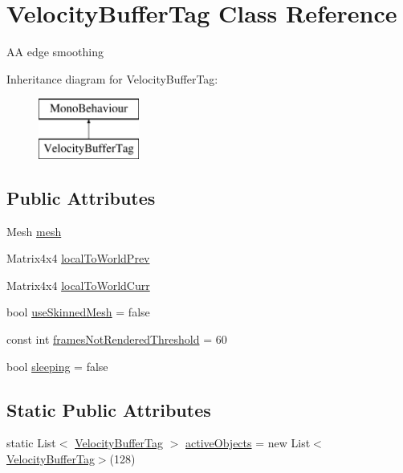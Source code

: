 \hypertarget{class_velocity_buffer_tag}{}\section{Velocity\+Buffer\+Tag Class Reference}
\label{class_velocity_buffer_tag}


AA edge smoothing  


Inheritance diagram for Velocity\+Buffer\+Tag\+:\begin{figure}[H]
\begin{center}
\leavevmode
\includegraphics[height=2.000000cm]{class_velocity_buffer_tag}
\end{center}
\end{figure}
\subsection*{Public Attributes}
\begin{DoxyCompactItemize}
\item 
Mesh \mbox{\hyperlink{class_velocity_buffer_tag_a163f9e15132764a035a268802494a86d}{mesh}}
\item 
Matrix4x4 \mbox{\hyperlink{class_velocity_buffer_tag_a0833e64a1ec98596b324b8f8c72f1ad0}{local\+To\+World\+Prev}}
\item 
Matrix4x4 \mbox{\hyperlink{class_velocity_buffer_tag_a7df321716493a4f323186e062e407435}{local\+To\+World\+Curr}}
\item 
bool \mbox{\hyperlink{class_velocity_buffer_tag_a2242c0bf56dce5a4e6c907d4e51df258}{use\+Skinned\+Mesh}} = false
\item 
const int \mbox{\hyperlink{class_velocity_buffer_tag_a899f30a99f6c5145a1a77f600ec5c9a7}{frames\+Not\+Rendered\+Threshold}} = 60
\item 
bool \mbox{\hyperlink{class_velocity_buffer_tag_af5527fdf6f713e520396f519369ddda8}{sleeping}} = false
\end{DoxyCompactItemize}
\subsection*{Static Public Attributes}
\begin{DoxyCompactItemize}
\item 
static List$<$ \mbox{\hyperlink{class_velocity_buffer_tag}{Velocity\+Buffer\+Tag}} $>$ \mbox{\hyperlink{class_velocity_buffer_tag_a82a0ec789986105db683185b983690f0}{active\+Objects}} = new List$<$\mbox{\hyperlink{class_velocity_buffer_tag}{Velocity\+Buffer\+Tag}}$>$(128)
\end{DoxyCompactItemize}


